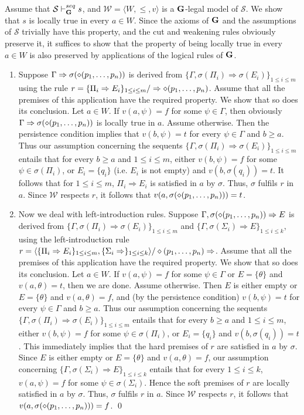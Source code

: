 \documentclass{LMCS}
\theoremstyle{remark}
\newcommand{\Ss}{\mathcal{S}}
\newcommand{\G}{{\bf G}}
\newcommand{\W}{\mathcal{W}}
\newcommand{\dd}{\diamond}
\newcommand{\ptil}{p_1 \til p_n}
\newcommand{\bi}{\begin{enumerate}[$\bullet$]}
\newcommand{\ei}{\end{enumerate}}
\newcommand{\Ra}{\Rightarrow}
\newcommand{\g}{\Gamma}
\newcommand{\vd}{\vdash}
\newcommand{\tup}[1]{\langle #1 \rangle}
\begin{document}
\sloppy
\proof
Assume that ${\Ss\vd_\G^{seq}s}$, 
and ${\W=\tup{W, \leq,v}}$ is a ${\G}$-legal model of $\Ss$. 
We show that $s$ is locally true in every  ${a\in W}$.
Since the axioms of ${\G}$ and the assumptions of $\Ss$ trivially
have this property, and the cut and weakening rules obviously preserve it,
it suffices to show that the property of being locally true in every $a\in W$
is also preserved by applications of the logical rules of ${\G}$.
\bi
\item 
Suppose ${\g\Ra \sigma(\dd(\ptil))}$
is derived from ${\{\g,\sigma(\Pi_i) \Ra \sigma(E_i)\}_{1 \leq i \leq m}}$
using the rule
${r=\{\Pi_i \Ra E_i\}_{1 \leq i \leq m} / \Ra \dd(\ptil)}$.
Assume that all the premises of this application have the required property.
We show that so does its conclusion. 
Let ${a\in W}$. 
If ${v(a,\psi)=f}$ for some ${\psi\in\g}$, then obviously  
${\g\Ra \sigma(\dd(\ptil))}$ is locally true in ${a}$. 
Assume otherwise. 
Then the persistence condition implies that
${v(b,\psi)=t}$ for every ${\psi\in\g}$ and ${b\geq a}$.
Thus our assumption concerning the sequents
${\{\g,\sigma(\Pi_i) \Ra \sigma(E_i)\}_{1 \leq i \leq m}}$ entails
that for every ${b\geq a}$ and ${1 \leq i \leq m}$, either ${v(b,\psi)=f}$ for
some ${\psi\in\sigma(\Pi_i)}$, or $E_i=\{q_i\}$ 
(i.e. $E_i$ is not empty) and ${v(b,\sigma(q_i))=t}$. 
It follows that for ${1 \leq i \leq m}$, ${\Pi_i \Ra E_i}$
is satisfied in ${a}$ by $\sigma$.
Thus, $\sigma$ fulfils $r$ in $a$.
Since ${\W}$ respects $r$, 
it follows that ${v(a,\sigma(\dd(\ptil)))=t}$.
\item
Now we deal with left-introduction rules.
Suppose ${\g, \sigma(\dd(\ptil))\Ra E}$ is derived from
${\{\g,\sigma(\Pi_i) \Ra \sigma(E_i)\}_{1 \leq i \leq m}}$ 
and ${\{\g,\sigma(\Sigma_i) \Ra E\}_{1 \leq i \leq k}}$,
using the left-introduction rule 
${r=\tup{\{\Pi_i \Ra E_i\}_{1 \leq i \leq m}, \{\Sigma_i \Ra \}_{1 \leq i \leq k}}/\dd(\ptil)\Ra}$.
Assume that all the premises of this application have the required property.
We show that so does its conclusion. 
Let ${a\in W}$. 
If ${v(a,\psi)=f}$ for some ${\psi\in\g}$ 
or ${E=\{\theta\}}$ and ${v(a,\theta)=t}$, then we are done. 
Assume otherwise. 
Then $E$ is either empty or ${E=\{\theta\}}$ and ${v(a,\theta)=f}$,
and (by the persistence condition)
${v(b,\psi)=t}$ for every ${\psi\in\g}$ and ${b\geq a}$.
Thus our assumption concerning the sequents
${\{\g,\sigma(\Pi_i) \Ra \sigma(E_i)\}_{1 \leq i \leq m}}$ entails
that for every ${b\geq a}$ and ${1 \leq i \leq m}$, either ${v(b,\psi)=f}$ for
some ${\psi\in\sigma(\Pi_i)}$, or ${E_i=\{q_i\}}$ and ${v(b,\sigma(q_i))=t}$.
This immediately implies that the hard premises of $r$ are satisfied in ${a}$ by $\sigma$. 
Since $E$ is either empty or ${E=\{\theta\}}$
and ${v(a,\theta)=f}$, our assumption concerning
${\{\g,\sigma(\Sigma_i) \Ra E\}_{1 \leq i \leq k}}$ entails
that for every ${1 \leq i \leq k}$,
${v(a,\psi)=f}$ for some ${\psi\in\sigma(\Sigma_i)}$.
Hence the soft premises of $r$ are locally satisfied in ${a}$ by $\sigma$.
Thus, $\sigma$ fulfils $r$ in $a$.
Since ${\W}$ respects $r$, 
it follows that ${v(a,\sigma(\dd(\ptil)))=f}$.
\qed\ei
\fussy
\end{document}
